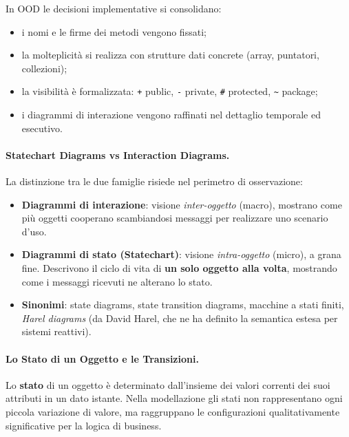 \documentclass[12pt]{extarticle}
\begin{document}
\noindent In OOD le decisioni implementative si consolidano:
\begin{itemize}
    \item i nomi e le firme dei metodi vengono fissati;
    \item la molteplicità si realizza con strutture dati concrete (array, puntatori, collezioni);
    \item la visibilità è formalizzata: \texttt{+} public, \texttt{-} private, \texttt{\#} protected, \texttt{\textasciitilde} package;
    \item i diagrammi di interazione vengono raffinati nel dettaglio temporale ed esecutivo.
\end{itemize}

\paragraph{Statechart Diagrams vs Interaction Diagrams.}
La distinzione tra le due famiglie risiede nel perimetro di osservazione:
\begin{itemize}
    \item \textbf{Diagrammi di interazione}: visione \textit{inter-oggetto} (macro), mostrano come più oggetti cooperano scambiandosi messaggi per realizzare uno scenario d'uso.
    \item \textbf{Diagrammi di stato (Statechart)}: visione \textit{intra-oggetto} (micro), a grana fine. Descrivono il ciclo di vita di \textbf{un solo oggetto alla volta}, mostrando come i messaggi ricevuti ne alterano lo stato.
    \item \textbf{Sinonimi}: state diagrams, state transition diagrams, macchine a stati finiti, \textit{Harel diagrams} (da David Harel, che ne ha definito la semantica estesa per sistemi reattivi).
\end{itemize}

\paragraph{Lo Stato di un Oggetto e le Transizioni.}
Lo \textbf{stato} di un oggetto è determinato dall'insieme dei valori correnti dei suoi attributi in un dato istante. Nella modellazione gli stati non rappresentano ogni piccola variazione di valore, ma raggruppano le configurazioni qualitativamente significative per la logica di business.
\end{document}
